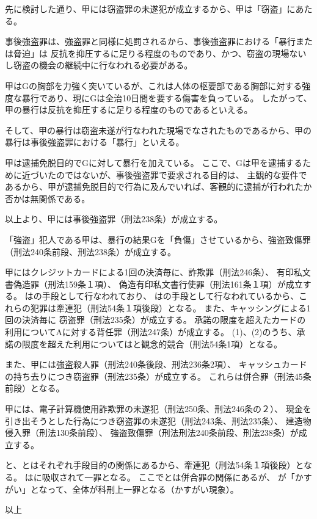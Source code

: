 \documentclass[11pt]{jsarticle}
\begin{document}
		\sectionC{}
			先に検討した通り、甲には窃盗罪の未遂犯が成立するから、甲は「窃盗」にあたる。
	
		\sectionC{}	
			事後強盗罪は、強盗罪と同様に処罰されるから、事後強盗罪における「暴行または脅迫」は
			反抗を抑圧するに足りる程度のものであり、かつ、窃盗の現場ないし窃盗の機会の継続中に行なわれる必要がある。
		
			甲はGの胸部を力強く突いているが、これは人体の枢要部である胸部に対する強度な暴行であり、現にGは全治10日間を要する傷害を負っている。
			したがって、甲の暴行は反抗を抑圧するに足りる程度のものであるといえる。
		
			そして、甲の暴行は窃盗未遂が行なわれた現場でなされたものであるから、甲の暴行は事後強盗罪における「暴行」といえる。
		
		\sectionC{}
			甲は逮捕免脱目的でGに対して暴行を加えている。
			ここで、Gは甲を逮捕するために近づいたのではないが、事後強盗罪で要求される目的は、
			主観的な要件であるから、甲が逮捕免脱目的で行為に及んでいれば、客観的に逮捕が行われたか否かは無関係である。
			
			以上より、甲には事後強盗罪（刑法238条）が成立する。
			
	\sectionB{}
		「強盗」犯人である甲は、暴行の結果Gを「負傷」させているから、強盗致傷罪（刑法240条前段、刑法238条）が成立する。

		\sectionC{}
		甲にはクレジットカードによる1回の決済毎に、詐欺罪（刑法246条）、
			有印私文書偽造罪（刑法159条１項）、
			偽造有印私文書行使罪（刑法161条１項）が成立する。
			はの手段として行なわれており、
			はの手段として行なわれているから、これらの犯罪は牽連犯（刑法54条１項後段）となる。
		\sectionC{}
			また、キャッシングによる1回の決済毎に
			窃盗罪（刑法235条）が成立する。
		\sectionC{}
			承諾の限度を超えたカードの利用についてAに対する背任罪（刑法247条）が成立する。
			(1)、(2)のうち、承諾の限度を超えた利用についてはと観念的競合（刑法54条1項）となる。
		
		また、甲には強盗殺人罪（刑法240条後段、刑法236条2項）、
		キャッシュカードの持ち去りにつき窃盗罪（刑法235条）が成立する。
		これらは併合罪（刑法45条前段）となる。
		
		甲には、電子計算機使用詐欺罪の未遂犯（刑法250条、刑法246条の２）、
		現金を引き出そうとした行為につき窃盗罪の未遂犯（刑法243条、刑法235条）、
		建造物侵入罪（刑法130条前段）、
		強盗致傷罪（刑法刑法240条前段、刑法238条）が成立する。
		
		と、とはそれぞれ手段目的の関係にあるから、牽連犯（刑法54条１項後段）となる。
		はに吸収されて一罪となる。
		ここでとは併合罪の関係にあるが、
		が「かすがい」となって、全体が科刑上一罪となる（かすがい現象）。
					
\begin{flushright}
	以上
\end{flushright}
	
\end{document}
